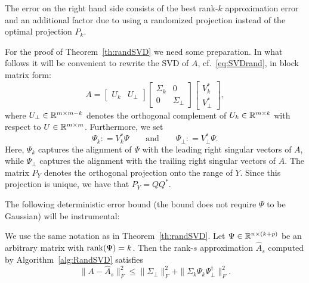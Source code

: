 The error on the right hand side consists of the best rank-$k$ approximation error and an additional factor due to using a randomized projection instead of the optimal projection $P_k$.

For the proof of Theorem~\ref{th:randSVD} we need some preparation. In what follows it will be convenient to rewrite the SVD of $A$, cf.~\eqref{eq:SVDrand}, in block matrix form:
\begin{equation}
A = \begin{bmatrix}  U_k & U_\perp \end{bmatrix} \begin{bmatrix}  \Sigma_k & 0 \\ 0 & \Sigma_\perp \end{bmatrix} \begin{bmatrix}  V_k^{\ast} \\ V_\perp^{\ast} \end{bmatrix},
\end{equation}
where $ U_\perp \in \mathbb{R}^{m \times m-k}$ denotes the orthogonal complement of $U_k \in \mathbb{R}^{m \times k}$ with respect to $U \in \mathbb{R}^{m \times m}$.
Furthermore, we set 
$$\Psi_k : = V_k^\ast \Psi \qquad \text{and} \qquad \Psi_\perp : = V_\perp^\ast \Psi .$$
Here, $\Psi_k$ captures the alignment of $\Psi$ with the leading right singular vectors of $A$, while  $\Psi_\perp$ captures
the alignment with the trailing right singular vectors of $A$. 
The matrix $P_Y$ denotes the orthogonal projection onto the range of $Y$. Since this projection is unique, we have that $P_Y = Q Q^{\ast}$.


The following deterministic error bound (the bound does not
require $\Psi$ to be Gaussian) will be instrumental:

\begin{lemma}\label{le:SVDerrorbound}
We use the same notation as in Theorem~\ref{th:randSVD}. Let $\Psi \in \mathbb{R}^{n \times (k+p)}$ be an arbitrary matrix with 
 $\operatorname{rank}(\Psi)=k$. Then the rank-$s$ approximation $\hat{A}_s$ computed by Algorithm~\ref{alg:RandSVD} satisfies
\begin{equation}\label{RSVDdeterministic}
\| A - \hat{A}_s\|^2_F \le \|\Sigma_\perp\|_F^2 + \|\Sigma_k \Psi_k \Psi_\perp^{\dagger}\|_F^2.
\end{equation}
\end{lemma}


